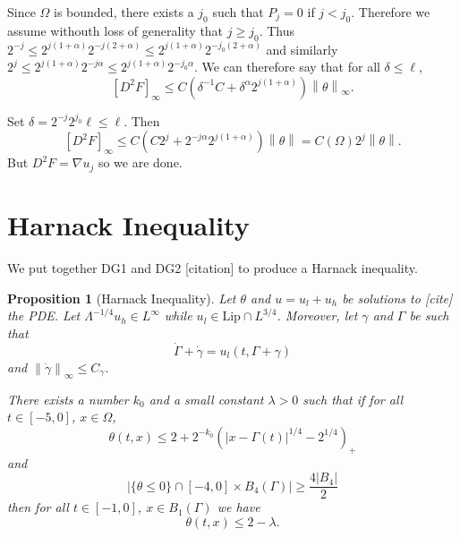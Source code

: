 \documentclass[11pt]{amsart}
\newtheorem{proposition}[theorem]{Proposition}
\theoremstyle{remark}
\newcommand{\norm}[1]{\left\lVert#1\right\rVert}
\newcommand{\paren}[1]{\left( #1 \right)}
\newcommand{\bracket}[1]{\left[ #1 \right]}
\newcommand{\abs}[1]{\left\lvert #1 \right\rvert}
\newcommand{\grad}{\nabla}
\newcommand{\Lip}{\text{Lip}}
\newcommand{\n}{^{-1}}
\newcommand{\ulow}{u_l}
\newcommand{\uhigh}{u_h}
\begin{document}
Since $\Omega$ is bounded, there exists a $j_0$ such that $P_j = 0$ if $j < j_0$.  Therefore we assume withouth loss of generality that $j \geq j_0$.  Thus $2^{-j} \leq 2^{j(1+\alpha)} 2^{-j(2+\alpha)} \leq 2^{j(1+\alpha)} 2^{-j_0(2+\alpha)}$ and similarly $2^j \leq 2^{j(1+\alpha)}2^{-j\alpha} \leq 2^{j(1+\alpha)} 2^{-j_0\alpha}$.  We can therefore say that for all $\delta \leq \ell$,
\[ \bracket{D^2 F}_\infty \leq C \paren{\delta\n C + \delta^\alpha 2^{j(1+\alpha)}} \norm{\theta}_\infty. \]

Set $\delta = 2^{-j} 2^{j_0} \ell \leq \ell$.  Then
\[ \bracket{D^2 F}_\infty \leq C \paren{C 2^j + 2^{-j\alpha} 2^{j(1+\alpha)}} \norm{\theta} = C(\Omega) 2^j \norm{\theta}. \]
But $D^2 F = \grad u_j$ so we are done.  


\section{Harnack Inequality}

We put together DG1 and DG2 [citation] to produce a Harnack inequality.  

\begin{proposition}[Harnack Inequality]
Let $\theta$ and $u = \ulow + \uhigh$ be solutions to [cite] the PDE.  Let $\Lambda^{-1/4} \uhigh \in L^\infty$ while $\ulow \in \Lip \cap L^{3/4}$.  Moreover, let $\gamma$ and $\Gamma$ be such that
\[ \dot{\Gamma} + \dot{\gamma} = \ulow(t,\Gamma+\gamma) \]
and $\norm{\dot{\gamma}}_\infty \leq C_\gamma$. 

There exists a number $k_0$ and a small constant $\lambda>0$ such that if for all $t \in [-5,0]$, $x \in \Omega$,
\[ \theta(t,x) \leq 2 + 2^{-k_0} \paren{|x-\Gamma(t)|^{1/4}-2^{1/4}}_+ \]
and
\[ \abs{\{\theta \leq 0\} \cap [-4,0]\times B_4(\Gamma)} \geq \frac{4|B_4|}{2} \]
then for all $t \in [-1,0]$, $x \in B_1(\Gamma)$ we have
\[ \theta(t,x) \leq 2 - \lambda. \]
\end{proposition}
\end{document}
